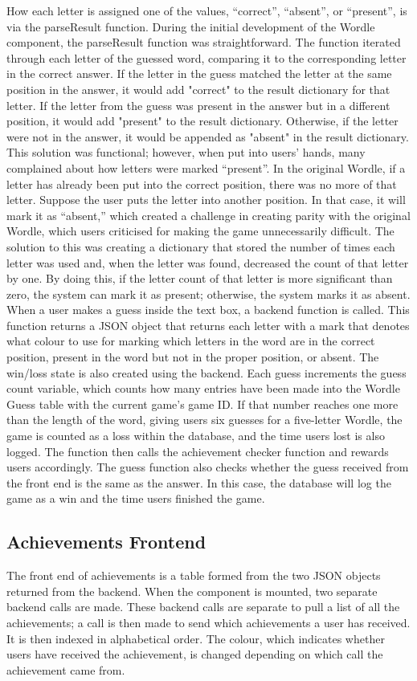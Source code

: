 How each letter is assigned one of the values, “correct”, “absent”, or “present”, is via the parseResult function. During the initial development of the Wordle component, the parseResult function was straightforward. The function iterated through each letter of the guessed word, comparing it to the corresponding letter in the correct answer. If the letter in the guess matched the letter at the same position in the answer, it would add "correct" to the result dictionary for that letter. If the letter from the guess was present in the answer but in a different position, it would add "present" to the result dictionary. Otherwise, if the letter were not in the answer, it would be appended as "absent" in the result dictionary. This solution was functional; however, when put into users' hands, many complained about how letters were marked “present”.
In the original Wordle, if a letter has already been put into the correct position, there was no more of that letter. Suppose the user puts the letter into another position. In that case, it will mark it as “absent,” which created a challenge in creating parity with the original Wordle, which users criticised for making the game unnecessarily difficult. The solution to this was creating a dictionary that stored the number of times each letter was used and, when the letter was found, decreased the count of that letter by one. By doing this, if the letter count of that letter is more significant than zero, the system can mark it as present; otherwise, the system marks it as absent.
When a user makes a guess inside the text box, a backend function is called. This function returns a JSON object that returns each letter with a mark that denotes what colour to use for marking which letters in the word are in the correct position, present in the word but not in the proper position, or absent.
The win/loss state is also created using the backend. Each guess increments the guess count variable, which counts how many entries have been made into the Wordle Guess table with the current game's game ID. If that number reaches one more than the length of the word, giving users six guesses for a five-letter Wordle, the game is counted as a loss within the database, and the time users lost is also logged. The function then calls the achievement checker function and rewards users accordingly. The guess function also checks whether the guess received from the front end is the same as the answer. In this case, the database will log the game as a win and the time users finished the game.

\subsection{Achievements Frontend}
The front end of achievements is a table formed from the two JSON objects returned from the backend. When the component is mounted, two separate backend calls are made. These backend calls are separate to pull a list of all the achievements; a call is then made to send which achievements a user has received. It is then indexed in alphabetical order. The colour, which indicates whether users have received the achievement, is changed depending on which call the achievement came from. 

